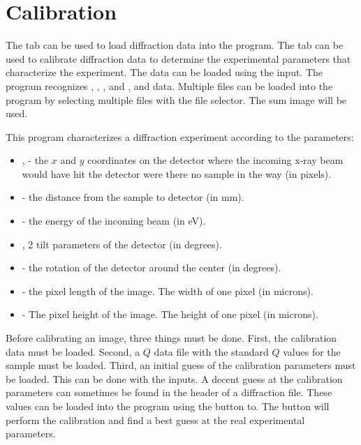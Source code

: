 \section{Calibration}

The  tab can be used to load
diffraction data into the program. The tab can
be used to calibrate diffraction data to determine the 
experimental parameters that characterize the experiment. 
The data can be loaded using the  input. 
The program recognizes , , 
, and , and  data. 
Multiple files can be loaded into the program
by selecting multiple files with the file selector.
The sum image will be used.

This program characterizes a diffraction experiment 
according to the parameters:
\index{$\alpha$}
\index{$\beta$}
\begin{itemize}
    \item {},  - the $x$ 
and $y$ coordinates on the detector where the incoming 
x-ray beam would have hit the detector were there 
no sample in the way (in pixels).
    \item {} - the distance from the sample to 
    detector (in mm).
    \item {} - the energy of the incoming beam (in eV).
    \item {},  2 tilt parameters of 
    the detector (in degrees).
    \item {} - the rotation of the detector 
    around the center (in degrees).
    \item {} - the pixel length of the image. 
    The width of one pixel (in microns).
    \item {} - The pixel height of the image. 
    The height of one pixel (in microns).
\end{itemize}
Before calibrating an image, three things must be done. 
First, the calibration data must be loaded.
Second, a $Q$ data file with the standard $Q$ values for the
sample must be loaded.
Third, an initial guess of the calibration parameters must be
loaded. This can be done with the  inputs. A
decent guess at the calibration parameters can sometimes
be found in the header of a diffraction file. These values
can be loaded into the program using the  
button to.  The  button will perform the calibration 
and find a best guess at the real experimental parameters.

